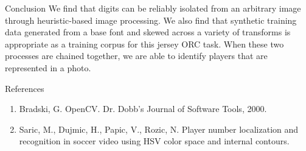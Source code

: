 \documentclass[final]{beamer}
\newlength{\onecolwid}
\begin{document}
\begin{frame}[t]
\begin{columns}[t]
\begin{column}{\onecolwid}
\begin{block}{Conclusion}
We find that digits can be reliably isolated from an arbitrary image through heuristic-based image processing. We also find that synthetic training data generated from a base font and skewed across a variety of transforms is appropriate as a training corpus for this jersey ORC task. When these two processes are chained together, we are able to identify players that are represented in a photo. 

\end{block}


\begin{block}{References}

\small{\begin{enumerate}
\item Bradski, G. OpenCV. Dr. Dobb's Journal of Software Tools, 2000.
\item Saric, M., Dujmic, H., Papic, V., Rozic, N. Player number localization and recognition in soccer video using HSV color space and internal contours.
\end{enumerate}}

\end{block}








\end{column}
\end{columns}
\end{frame}
\end{document}
